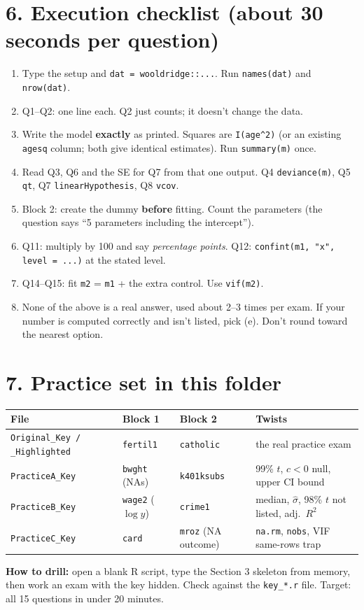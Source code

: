 \documentclass[10pt]{article}
\newcommand{\code}[1]{\texttt{#1}}
\begin{document}
\section*{6. Execution checklist (about 30 seconds per question)}
\begin{enumerate}[leftmargin=*]
\item Type the setup and \code{dat = wooldridge::...}. Run \code{names(dat)} and \code{nrow(dat)}.
\item Q1--Q2: one line each. Q2 just counts; it doesn't change the data.
\item Write the model \textbf{exactly} as printed. Squares are \code{I(age\^{}2)} (or an existing \code{agesq} column; both give identical estimates). Run \code{summary(m)} once.
\item Read Q3, Q6 and the SE for Q7 from that one output. Q4 \code{deviance(m)}, Q5 \code{qt}, Q7 \code{linearHypothesis}, Q8 \code{vcov}.
\item Block 2: create the dummy \textbf{before} fitting. Count the parameters (the question says ``5 parameters including the intercept'').
\item Q11: multiply by 100 and say \emph{percentage points}. Q12: \code{confint(m1, "x", level = ...)} at the stated level.
\item Q14--Q15: fit \code{m2} = \code{m1} + the extra control. Use \code{vif(m2)}.
\item None of the above is a real answer, used about 2--3 times per exam. If your number is computed correctly and isn't listed, pick (e). Don't round toward the nearest option.
\end{enumerate}

\section*{7. Practice set in this folder}
\begin{center}\small
\begin{tabular}{@{}llll@{}}\toprule
File & Block 1 & Block 2 & Twists\\ \midrule
\code{Original\_Key / \_Highlighted} & \code{fertil1} & \code{catholic} & the real practice exam\\
\code{PracticeA\_Key} & \code{bwght} (NAs) & \code{k401ksubs} & 99\% $t$, $c<0$ null, upper CI bound\\
\code{PracticeB\_Key} & \code{wage2} ($\log y$) & \code{crime1} & median, $\hat\sigma$, 98\% $t$ not listed, adj.\ $R^2$\\
\code{PracticeC\_Key} & \code{card} & \code{mroz} (NA outcome) & \code{na.rm}, \code{nobs}, VIF same-rows trap\\ \bottomrule
\end{tabular}
\end{center}
\textbf{How to drill:} open a blank R script, type the Section 3 skeleton from memory, then work an exam with the key hidden. Check against the \code{key\_*.r} file. Target: all 15 questions in under 20 minutes.
\end{document}
